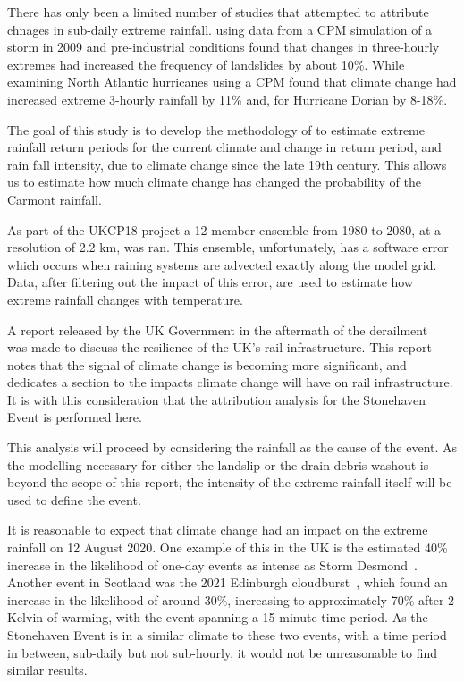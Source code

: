 \documentclass[11pt,a4paper]{article}
\begin{document}
There has only been a limited number of studies that attempted to attribute chnages in sub-daily extreme rainfall.  \cite{mishra2023landslide} using  data from a CPM simulation of a storm in 2009 and pre-industrial conditions found that changes in three-hourly extremes had increased the frequency of landslides by about 10\%. While \cite{Reed2022,Reed2021dorian_extreme_rain} examining North Atlantic hurricanes  using a CPM found that climate change had increased extreme 3-hourly rainfall by 11\% and, for Hurricane Dorian by 8-18\%. 


 The goal of this study is to develop the methodology of \cite{tett2023edinburgh}  to estimate extreme rainfall return periods for the current climate and change in return period, and rain fall intensity, due to climate change since the late 19th century. This allows us to estimate how much climate change has changed the probability of the Carmont rainfall.
 
   As part of the UKCP18 project\parencite{kendon2023uk_cpm} a 12 member ensemble from 1980 to 2080, at a resolution of 2.2 km, was ran.  This ensemble, unfortunately, has a software error which occurs when raining systems are advected exactly along the model grid.  Data, after filtering out the impact of this error, are used to estimate how extreme rainfall changes with temperature. 
   



A report released by the UK Government in the aftermath of the derailment~\cite{NR_DfT_2021}
was made to discuss the resilience of the UK's rail infrastructure.
This report notes that the signal of climate change is becoming more significant,
and dedicates a section to the impacts climate change will have on rail infrastructure.
It is with this consideration that the attribution analysis for the Stonehaven Event is performed here.

This analysis will proceed by considering the rainfall as the cause of the event.
As the modelling necessary for either the landslip or the drain debris washout is beyond the scope of this report,
the intensity of the extreme rainfall itself will be used to define the event.



It is reasonable to expect that climate change had an impact on the extreme rainfall on 12 August 2020.
One example of this in the UK is the estimated 40\% increase
in the likelihood of one-day events as intense as Storm Desmond~\cite{Desmond_2015}.
Another event in Scotland was the 2021 Edinburgh cloudburst~\cite{tett2023edinburgh},
which found an increase in the likelihood of around 30\%,
increasing to approximately 70\% after 2 Kelvin of warming,
with the event spanning a 15-minute time period.
As the Stonehaven Event is in a similar climate to these two events,
with a time period in between,
sub-daily but not sub-hourly,
it would not be unreasonable to find similar results.
\end{document}
